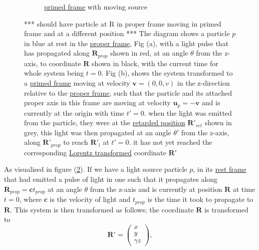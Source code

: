 \begin{figure}[ht]
\begin{subfigure}{.49\textwidth}
		\caption{\hyperlink{def-Primed-Frame}{primed frame} with moving source}
		\label{fig: primed frame 1}
	\end{subfigure}
	\caption{ *** should have particle at R in proper frame moving in primed frame and at a different position *** The diagram shows a particle $p$ in blue at rest in the \protect\hyperlink{def-proper-frame}{proper frame}, Fig (a), with a light pulse that has propagated along $\mathbf{R}_{prop}$ shown in red, at an angle $\theta$ from the z-axis, to coordinate $\mathbf{R}$ shown in black, with the current time for whole system being $t=0$.
	Fig (b), shows the system transformed to a \protect\hyperlink{def-Primed-Frame}{primed frame} moving at velocity $\mathbf{v}=(0,0,v)$ in the z-direction relative to the \protect\hyperlink{def-proper-frame}{proper frame}, such that the particle and its attached proper axis in this frame are moving at velocity $\mathbf{u}_p= - \mathbf{v}$ and is currently at the origin with time $t'=0$. when the light was emitted from the particle, they were at the \protect\hyperlink{def-retarded-position}{retarded position}  $\mathbf{R}'_{ret}$ shown in grey, this light was then propagated at an angle $\theta'$ from the z-axis, along $\mathbf{R}'_{prop}$ to reach $\mathbf{R}'_{l}$ at $t'=0$. it has not yet reached the corresponding \protect\hyperlink{def-lorentz-transform}{Lorentz transformed} coordinate $\mathbf{R}'$ }
	\label{fig: Retarded field outward field transform}
\end{figure}



As visualised in figure (\ref{fig: Retarded field outward field transform}). If we have a light source particle $p$, in its \hyperlink{def-proper-frame}{rest frame} that had emitted a pulse of light in one such that it propagates along $\mathbf{R}_{prop}=\mathbf{c}t_{prop}$ at an angle $\theta$ from the z-axis and is currently at position $\mathbf{R}$ at time $t=0$, where $\mathbf{c}$ is the velocity of light and $t_{prop}$ is the time it took to propagate to $\mathbf{R}$.
This system is then transformed as follows; the coordinate $\mathbf{R}$ is transformed to
\begin{equation}%
	\label{displacement transform}
	\mathbf{R'} =
	\begin{pmatrix}
		x \\ y \\ \gamma z
	\end{pmatrix},
\end{equation}%

